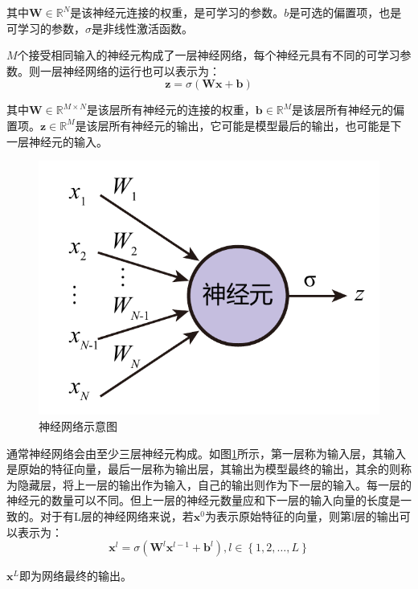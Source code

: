 其中$\bm{W}\in\mathbb{R}^N$是该神经元连接的权重，是可学习的参数。$b$是可选的偏置项，也是可学习的参数，$\sigma$是非线性激活函数。

$M$个接受相同输入的神经元构成了一层神经网络，每个神经元具有不同的可学习参数。则一层神经网络的运行也可以表示为：
\begin{equation}
    \bm{z}=\sigma\left(\bm{W}\bm{x}+\bm{b}\right)
\end{equation}

其中$\bm{W}\in\mathbb{R}^{M\times N}$是该层所有神经元的连接的权重，$\bm{b}\in\mathbb{R}^M$是该层所有神经元的偏置项。$\bm{z}\in\mathbb{R}^M$是该层所有神经元的输出，它可能是模型最后的输出，也可能是下一层神经元的输入。

\begin{figure}[]
    \centering
    \includegraphics[page=2]{figure/figures.pdf}
    \caption{神经网络示意图}
    \label{nnet}
\end{figure}

通常神经网络会由至少三层神经元构成。如图\ref{nnet}所示，第一层称为输入层，其输入是原始的特征向量，最后一层称为输出层，其输出为模型最终的输出，其余的则称为隐藏层，将上一层的输出作为输入，自己的输出则作为下一层的输入。每一层的神经元的数量可以不同。但上一层的神经元数量应和下一层的输入向量的长度是一致的。对于有L层的神经网络来说，若$\bm{x}^0$为表示原始特征的向量，则第l层的输出可以表示为：
\begin{equation}
    \bm{x}^l=\sigma\left(\bm{W}^l\bm{x}^{l-1}+\bm{b}^l\right),l\in\left\{1,2,\ldots,L\right\}
\end{equation}

$\bm{x}^L$即为网络最终的输出。

